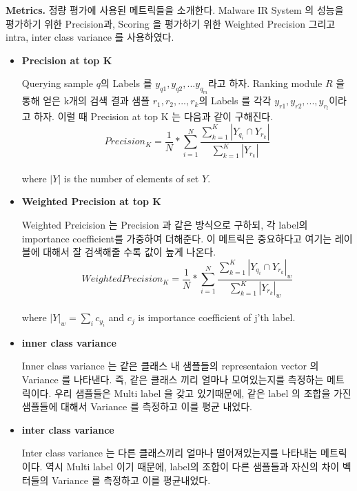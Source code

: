 \textbf{Metrics. } 정량 평가에 사용된 메트릭들을 소개한다. Malware IR System 의 성능을 평가하기 위한 Precision과, Scoring 을 평가하기 위한 Weighted Precision 그리고 intra, inter class variance 를 사용하였다. 
\begin{itemize}
	\item{ \textbf{Precision at top K} 


	Querying sample $q$의 Labels 를 $y_{q1}, y_{q2}, ... y_{q_m}$라고 하자. Ranking module $R$ 을 통해 얻은 k개의 검색 결과 샘플 $r_1, r_2, ..., r_k$의 Labels 를 각각 $y_{r1}, y_{r2}, ..., y_{r_l}$이라고 하자. 이럴 때 Precision at top K 는 다음과 같이 구해진다. 
	\[
	Precision_{K} = \frac{1}{N} *\sum_{i=1}^{N}{ \frac{ \sum_{k=1}^{K}{|Y_{q_i} \cap Y_{r_k}|}}{  \sum_{k=1}^{K}{ |Y_{r_k}| }  }}
	\]\\
	where $|Y|$ is the number of elements of set $Y$.
	}
	\item{ \textbf{Weighted Precision at top K } 
	
	Weighted Preicision 는 Precision 과 같은 방식으로 구하되, 각 label의 importance coefficient를 가중하여 더해준다. 이 메트릭은 중요하다고 여기는 레이블에 대해서 잘 검색해줄 수록 값이 높게 나온다. 
	\[
	WeightedPrecision_{K} = \frac{1}{N} *\sum_{i=1}^{N}{ \frac{ \sum_{k=1}^{K}{|Y_{q_i} \cap Y_{r_k}|_w}}{  \sum_{k=1}^{K}{ |Y_{r_k}|_w }  }}
	\]\\
	where $|Y|_w = \sum_i{c_{y_i}}$ and $c_j$ is importance coefficient of j'th label.
	}
	\item{ \textbf{inner class variance} 
	
	Inner class variance 는 같은 클래스 내 샘플들의 representaion vector 의 Variance 를 나타낸다. 즉, 같은 클래스 끼리 얼마나 모여있는지를 측정하는 메트릭이다. 우리 샘플들은 Multi label 을 갖고 있기때문에, 같은 label 의 조합을 가진 샘플들에 대해서 Variance 를 측정하고 이를 평균 내었다.   
	}
	\item{ \textbf{inter class variance} 
	
	Inter class variance 는 다른 클래스끼리 얼마나 떨어져있는지를 나타내는 메트릭이다. 역시 Multi label 이기 때문에, label의 조합이 다른 샘플들과 자신의 차이 벡터들의 Variance 를 측정하고 이를 평균내었다. 
	}
\end{itemize}

